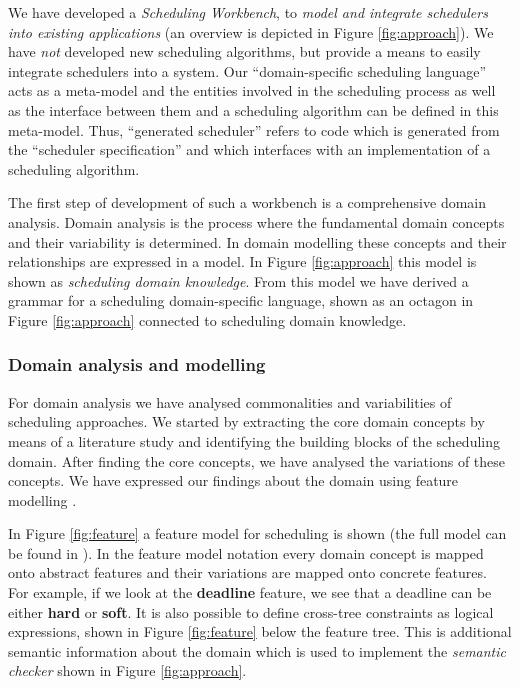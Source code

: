 	We have developed a \emph{Scheduling Workbench}, to \emph{model and integrate
	schedulers into existing applications} (an overview is depicted in Figure \ref{fig:approach}).
	We have \emph{not} developed new scheduling algorithms, but provide a means to easily integrate schedulers into a system. Our ``domain-specific scheduling language'' acts as a meta-model and the entities involved in the scheduling process as well as the interface between them and a scheduling algorithm can be defined in this meta-model. Thus, ``generated scheduler'' refers to code which is generated from the ``scheduler specification'' and which interfaces with an implementation of a scheduling algorithm.
	
	The first step of development of such a workbench is a comprehensive domain
	analysis. Domain analysis is the process where the fundamental domain concepts
	and their variability is determined. In domain modelling these concepts and their
	relationships are expressed in a model. In Figure \ref{fig:approach} this model
	is shown as \emph{scheduling domain knowledge}. From this model we have derived
	a grammar for a scheduling domain-specific language, shown as an octagon
	in Figure \ref{fig:approach} connected to scheduling domain knowledge.
	
	
	\subsubsection{Domain analysis and modelling}
	For domain analysis we have analysed commonalities and variabilities of scheduling approaches.
	We started by extracting the core domain concepts by means of a literature study
	and identifying the building blocks of the scheduling domain. After finding the
	core concepts, we have analysed the variations of these concepts.
	We have expressed our findings about the domain using feature modelling \cite{kang1990feature}. 
	
	In Figure \ref{fig:feature} a feature model for scheduling is shown
	(the full model can be found in \cite{Hatun:2011:FMD:1960518.1960520}).
	In the feature model notation every domain concept
	is mapped onto abstract features and their variations are mapped
	onto concrete features. For example, if we look at the \textbf{deadline} feature,
	we see that a deadline can be either \textbf{hard} or \textbf{soft}. It is also
	possible to define cross-tree constraints as logical expressions, shown in
	Figure \ref{fig:feature} below the feature tree. This is additional semantic
	information about the domain which is used to implement the \emph{semantic
	checker} shown in Figure \ref{fig:approach}.
	
